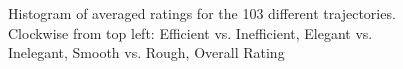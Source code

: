 \documentclass[letterpaper, 10 pt, conference]{ieeeconf}  %
\begin{document}
\begin{figure}[t]
  \caption{Histogram of averaged ratings for the 103 different trajectories. Clockwise from top left: Efficient vs. Inefficient, Elegant vs. Inelegant, Smooth vs. Rough, Overall Rating}
\label{fig:survey_raw}
\end{figure}
\end{document}
